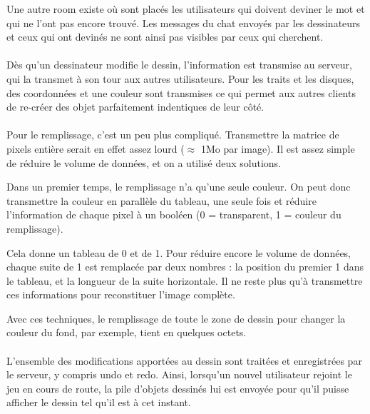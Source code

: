 \documentclass[11pt,a4paper]{article}
\begin{document}
                Une autre room existe où sont placés les utilisateurs qui doivent deviner le mot et qui ne l'ont pas encore trouvé.
                Les messages du chat envoyés par les dessinateurs et ceux qui ont devinés ne sont ainsi pas visibles par ceux qui cherchent.
                \paragraph{}
                Dès qu'un dessinateur modifie le dessin, l'information est transmise au serveur,
                qui la transmet à son tour aux autres utilisateurs.
                Pour les traits et les disques,
                des coordonnées et une couleur sont transmises ce qui permet aux autres
                clients de re-créer des objet parfaitement indentiques de leur côté.
                \paragraph{}
                Pour le remplissage, c'est un peu plus compliqué.
                Transmettre la matrice de pixels entière serait en effet assez lourd ($\approx$ 1Mo par image).
                Il est assez simple de réduire le volume de données, et on a utilisé deux solutions.

                Dans un premier temps, le remplissage n'a qu'une seule couleur.
                On peut donc transmettre la couleur en parallèle du tableau, une seule fois et réduire l'information de chaque pixel à un booléen
                (0 = transparent, 1 = couleur du remplissage).
                
                Cela donne un tableau de 0 et de 1.
                Pour réduire encore le volume de données,
                chaque suite de 1 est remplacée par deux nombres :
                la position du premier 1 dans le tableau, et la longueur de la suite horizontale.
                Il ne reste plus qu'à transmettre ces informations pour reconstituer l'image complète.
                
                Avec ces techniques, le remplissage de toute le zone de dessin pour changer la couleur du fond,
                par exemple, tient en quelques octets.
                \paragraph{}
                L'ensemble des modifications apportées au dessin sont traitées et enregistrées par le serveur,
                y compris undo et redo.
                Ainsi, lorsqu'un nouvel utilisateur rejoint le jeu en cours de route,
                la pile d'objets dessinés lui est envoyée pour qu'il puisse afficher le dessin tel qu'il est à cet instant.
\end{document}
